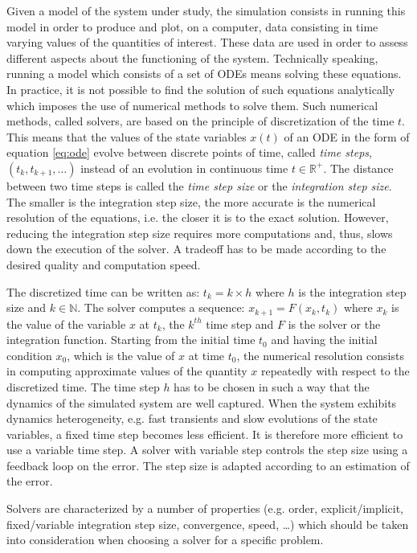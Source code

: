 Given a model of the system under study, the simulation consists in running this model in order to produce and plot, on a computer, data consisting in time varying values of the quantities of interest. These data are used in order to assess different aspects about the functioning of the system. Technically speaking, running a model which consists of a set of ODEs means solving these equations. In practice, it is not possible to find the solution of such equations analytically which imposes the use of numerical methods to solve them. Such numerical methods, called solvers, are based on the principle of discretization of the time $t$. This means that the values of the state variables $x(t)$ of an ODE in the form of equation \ref{eq:ode} evolve between discrete points of time, called \textit{time steps}, $(t_k, t_{k+1}, \ldots)$ instead of an evolution in continuous time $t \in \mathbb{R}^+$. The distance between two time steps is called the \textit{time step size} or the \textit{integration step size}. The smaller is the integration step size, the more accurate is the numerical resolution of the equations, i.e. the closer it is to the exact solution. However, reducing the integration step size requires more computations and, thus, slows down the execution of the solver. A tradeoff has to be made according to the desired quality and computation speed.

The discretized time can be written as: $t_k = k \times h$ where $h$ is the integration step size and $k \in \mathbb{N}$. The solver computes a sequence: $x_{k+1} = F(x_k,t_k)$ where $x_k$ is the value of the variable $x$ at $t_k$, the $k^{th}$ time step and $F$ is the solver or the integration function. Starting from the initial time $t_0$ and having the initial condition $x_0$, which is the value of $x$ at time $t_0$, the numerical resolution consists in computing approximate values of the quantity $x$ repeatedly with respect to the discretized time. The time step $h$ has to be chosen in such a way that the dynamics of the simulated system are well captured. When the system exhibits dynamics heterogeneity, e.g. fast transients and slow evolutions of the state variables, a fixed time step becomes less efficient. It is therefore  more efficient to use a variable time step. A solver with variable step controls the step size using a feedback loop on the error. The step size is adapted according to an estimation of the error. 

Solvers are characterized by a number of properties (e.g. order, explicit/implicit, fixed/variable integration step size, convergence, speed, \ldots) which should be taken into consideration when choosing a solver for a specific problem. %

